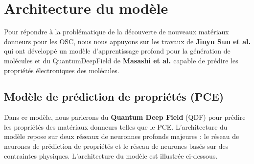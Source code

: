 \section{Architecture du modèle}

Pour répondre à la problématique de la découverte de nouveaux matériaux donneurs pour les OSC, 
nous nous appuyons sur les travaux de \textbf{Jinyu Sun et al. \cite{Sun}} qui ont développé un modèle d'apprentissage profond pour la génération de molécules et du QuantumDeepField de \textbf{Masashi et al. \cite{Masashi}} capable de prédire les propriétés électroniques des molécules. 

\subsection{Modèle de prédiction de propriétés (PCE)}

Dans ce modèle, nous parlerons du \textbf{Quantum Deep Field} (QDF) pour prédire les propriétés des matériaux donneurs telles que le PCE.
L'architecture du modèle repose sur deux réseaux de neuronnes profonds majeures : le réseau de neurones de prédiction de propriétés et le réseau de neurones basés sur des contraintes physiques.
L'architecture du modèle est illustrée ci-dessous. \\



